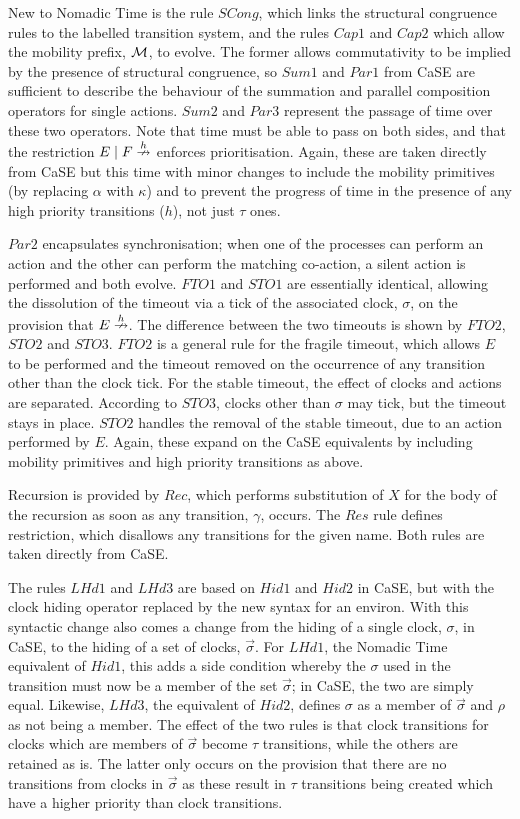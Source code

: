 New to Nomadic Time is the rule $SCong$, which links the structural
congruence rules to the labelled transition system, and the rules
$Cap1$ and $Cap2$ which allow the mobility prefix, $\text{$\mathcal{M}$}$, to
evolve.  The former allows commutativity to be implied by the presence
of structural congruence, so $Sum1$ and $Par1$ from CaSE are
sufficient to describe the behaviour of the summation and parallel
composition operators for single actions.  $Sum2$ and $Par3$ represent
the passage of time over these two operators.  Note that time must be
able to pass on both sides, and that the restriction $E \mid F
\stackrel{h}{\nrightarrow}$ enforces prioritisation.  Again, these are taken
directly from CaSE but this time with minor changes to include the
mobility primitives (by replacing $\alpha$ with $\kappa$) and to
prevent the progress of time in the presence of any high priority
transitions ($h$), not just $\tau$ ones.

$Par2$ encapsulates synchronisation; when one of the processes can
perform an action and the other can perform the matching co-action, a
silent action is performed and both evolve.  $FTO1$ and $STO1$ are
essentially identical, allowing the dissolution of the timeout via a
tick of the associated clock, $\sigma$, on the provision that $E
\stackrel{h}{\nrightarrow}$.  The difference between the two timeouts is shown by
$FTO2$, $STO2$ and $STO3$.  $FTO2$ is a general rule for the fragile
timeout, which allows $E$ to be performed and the timeout removed on
the occurrence of any transition other than the clock tick.  For the
stable timeout, the effect of clocks and actions are separated.
According to $STO3$, clocks other than $\sigma$ may tick, but the
timeout stays in place.  $STO2$ handles the removal of the stable
timeout, due to an action performed by $E$.  Again, these expand on
the CaSE equivalents by including mobility primitives and high
priority transitions as above.

Recursion is provided by $Rec$, which performs substitution of $X$ for
the body of the recursion as soon as any transition, $\gamma$, occurs.
The $Res$ rule defines restriction, which disallows any transitions
for the given name.  Both rules are taken directly from CaSE.

The rules $LHd1$ and $LHd3$ are based on $Hid1$ and $Hid2$ in CaSE,
but with the clock hiding operator replaced by the new syntax for an
environ.  With this syntactic change also comes a change from the
hiding of a single clock, $\sigma$, in CaSE, to the hiding of a set of
clocks, $\vec{\sigma}$.  For $LHd1$, the Nomadic Time equivalent of
$Hid1$, this adds a side condition whereby the $\sigma$ used in the
transition must now be a member of the set $\vec{\sigma}$; in CaSE,
the two are simply equal.  Likewise, $LHd3$, the equivalent of $Hid2$,
defines $\sigma$ as a member of $\vec{\sigma}$ and $\rho$ as not being
a member.  The effect of the two rules is that clock transitions for
clocks which are members of $\vec{\sigma}$ become $\tau$ transitions,
while the others are retained as is.  The latter only occurs on the
provision that there are no transitions from clocks in $\vec{\sigma}$
as these result in $\tau$ transitions being created which have a
higher priority than clock transitions.

